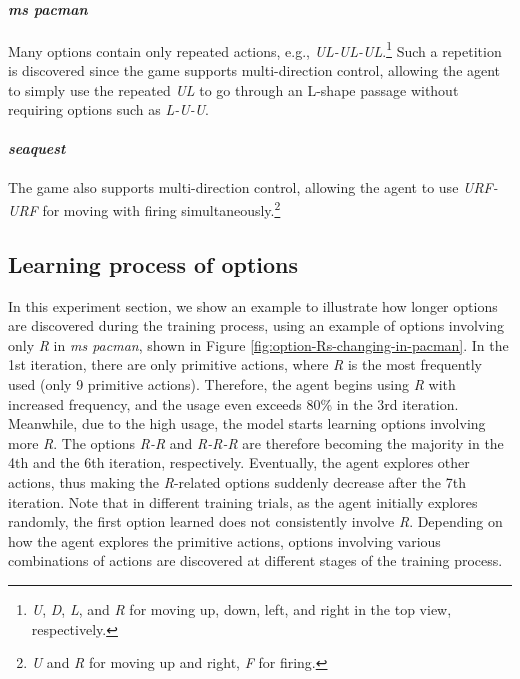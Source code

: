 \paragraph{\textit{ms pacman}}
Many options contain only repeated actions, e.g., \textit{UL-UL-UL}.\footnote{\textit{U}, \textit{D}, \textit{L}, and \textit{R} for moving up, down, left, and right in the top view, respectively.}
Such a repetition is discovered since the game supports multi-direction control, allowing the agent to simply use the repeated \textit{UL} to go through an L-shape passage without requiring options such as \textit{L-U-U}.

\paragraph{\textit{seaquest}}
The game also supports multi-direction control, allowing the agent to use \textit{URF-URF} for moving with firing simultaneously.\footnote{\textit{U} and \textit{R} for moving up and right, \textit{F} for firing.}

\clearpage

\subsection{Learning process of options}
\label{appendix:learn-option-process}

In this experiment section, we show an example to illustrate how longer options are discovered during the training process, using an example of options involving only \textit{R} in \textit{ms pacman}, shown in Figure \ref{fig:option-Rs-changing-in-pacman}.
In the 1st iteration, there are only primitive actions, where \textit{R} is the most frequently used (only 9 primitive actions).
Therefore, the agent begins using \textit{R} with increased frequency, and the usage even exceeds 80\% in the 3rd iteration.
Meanwhile, due to the high usage, the model starts learning options involving more \textit{R}.
The options \textit{R-R} and \textit{R-R-R} are therefore becoming the majority in the 4th and the 6th iteration, respectively.
Eventually, the agent explores other actions, thus making the \textit{R}-related options suddenly decrease after the 7th iteration.
Note that in different training trials, as the agent initially explores randomly, the first option learned does not consistently involve \textit{R}.
Depending on how the agent explores the primitive actions, options involving various combinations of actions are discovered at different stages of the training process.


